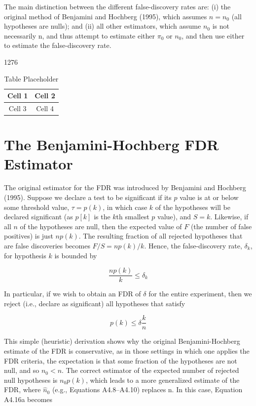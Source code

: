 \documentclass{article}
\begin{document}
The main distinction between the different false-discovery rates are: (i) the original method of Benjamini and Hochberg (1995), which assumes  $ n = n_0 $ (all hypotheses are nulls); and (ii) all other estimators, which assume  $ n_0 $ is not necessarily n, and thus attempt to estimate either  $ \pi_0 $ or  $ n_0 $, and then use either to estimate the false-discovery rate.

1276

\begin{table}[h]
\centering
\begin{tabular}{|c|c|}
\hline
Cell 1 & Cell 2 \\
\hline
Cell 3 & Cell 4 \\
\hline
\end{tabular}
\caption{Table Placeholder}
\end{table}

\section{The Benjamini-Hochberg FDR Estimator}
The original estimator for the FDR was introduced by Benjamini and Hochberg (1995). Suppose we declare a test to be significant if its $p$ value is at or below some threshold value, $\tau = p(k)$, in which case $k$ of the hypotheses will be declared significant (as $p[k]$ is the $k$th smallest $p$ value), and $S = k$. Likewise, if all $n$ of the hypotheses are null, then the expected value of $F$ (the number of false positives) is just $n p(k)$. The resulting fraction of all rejected hypotheses that are false discoveries becomes $F/S = n p(k)/k$. Hence, the false-discovery rate, $\delta_k$, for hypothesis $k$ is bounded by

\begin{equation}
\frac{np(k)}{k}\leq\delta_{k}
\end{equation}

In particular, if we wish to obtain an FDR of  $ \delta $ for the entire experiment, then we reject (i.e., declare as significant) all hypotheses that satisfy

\begin{equation}
p(k)\leq\delta\frac{k}{n}
\end{equation}

This simple (heuristic) derivation shows why the original Benjamini-Hochberg estimate of the FDR is conservative, as in those settings in which one applies the FDR criteria, the expectation is that some fraction of the hypotheses are not null, and so  $ n_0 < n $. The correct estimator of the expected number of rejected null hypotheses is  $ n_0 p(k) $, which leads to a more generalized estimate of the FDR, where  $ \widehat{n}_0 $ (e.g., Equations A4.8–A4.10) replaces n. In this case, Equation A4.16a becomes
\end{document}
